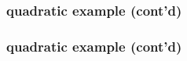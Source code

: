 \documentclass[10pt,dvipsnames*]{beamer}
\begin{document}
\begin{frame}
  \frametitle{quadratic example (cont'd)}
  \centering {}
\end{frame}
%
\begin{frame}
  \frametitle{quadratic example (cont'd)}
  \centering {}
\end{frame}
%
\end{document}
